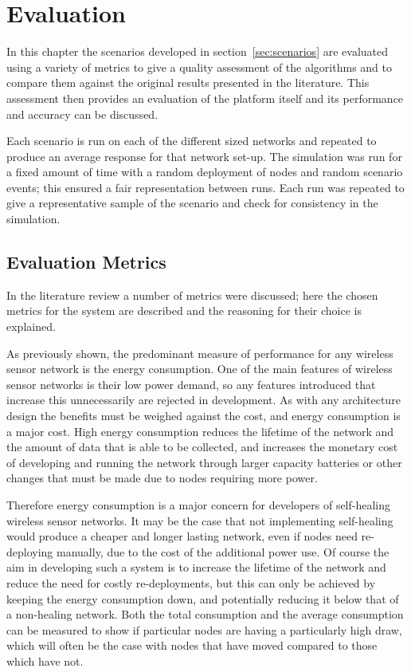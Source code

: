 \documentclass[authoryearcitations]{UoYCSproject}
\begin{document}
\chapter{Evaluation}
\label{cha:Eval}

In this chapter the scenarios developed in section~\ref{sec:scenarios} are evaluated using a variety of metrics to give a quality assessment of the algorithms and to compare them against the original results presented in the literature. This assessment then provides an evaluation of the platform itself and its performance and accuracy can be discussed.

Each scenario is run on each of the different sized networks and repeated to produce an average response for that network set-up. The simulation was run for a fixed amount of time with a random deployment of nodes and random scenario events; this ensured a fair representation between runs. Each run was repeated to give a representative sample of the scenario and check for consistency in the simulation.

\section{Evaluation Metrics}

In the literature review a number of metrics were discussed; here the chosen metrics for the system are described and the reasoning for their choice is explained.

As previously shown, the predominant measure of performance for any wireless sensor network is the energy consumption. One of the main features of wireless sensor networks is their low power demand, so any features introduced that increase this unnecessarily are rejected in development. As with any architecture design the benefits must be weighed against the cost, and energy consumption is a major cost. High energy consumption reduces the lifetime of the network and the amount of data that is able to be collected, and increases the monetary cost of developing and running the network through larger capacity batteries or other changes that must be made due to nodes requiring more power.

Therefore energy consumption is a major concern for developers of self-healing wireless sensor networks. It may be the case that not implementing self-healing would produce a cheaper and longer lasting network, even if nodes need re-deploying manually, due to the cost of the additional power use. Of course the aim in developing such a system is to increase the lifetime of the network and reduce the need for costly re-deployments, but this can only be achieved by keeping the energy consumption down, and potentially reducing it below that of a non-healing network. Both the total consumption and the average consumption can be measured to show if particular nodes are having a particularly high draw, which will often be the case with nodes that have moved compared to those which have not.
\end{document}
